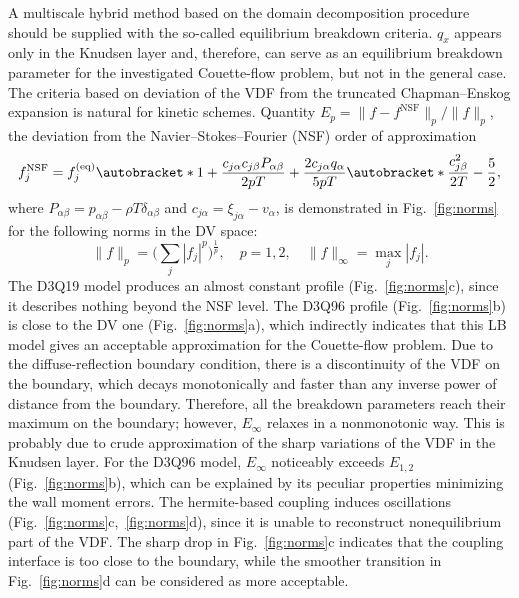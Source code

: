\documentclass{aip-cp}
\DeclarePairedDelimiter\autobracket()       %
\newcommand{\br}[1]{\autobracket*{#1}}
\newcommand{\xiai}{\xi_{j \alpha}}
\newcommand{\cai}{c_{j \alpha}}
\newcommand{\caj}{c_{j \beta}}
\newcommand{\equil}[1]{#1^\mathrm{(eq)}}
\begin{document}
A multiscale hybrid method based on the domain decomposition procedure should be supplied with the so-called equilibrium breakdown criteria.
\(q_x\) appears only in the Knudsen layer and, therefore, can serve as an equilibrium breakdown parameter
for the investigated Couette-flow problem, but not in the general case.
The criteria based on deviation of the VDF from the truncated Chapman--Enskog expansion is natural for kinetic schemes.
Quantity \(E_p=\|f-f^{\mathrm{NSF}}\|_p/\|f\|_p\), the deviation from the Navier--Stokes--Fourier (NSF) order of approximation~\cite{Zhang2014}
\begin{equation}\label{eq:NSF}
    f^{\mathrm{NSF}}_j = \equil{f}_j\br{
        1 + \frac{\cai\caj P_{\alpha\beta}}{2pT} + \frac{2\cai q_\alpha}{5pT}\br{\frac{\caj^2}{2T} - \frac52} },
\end{equation}
where \(P_{\alpha\beta} = p_{\alpha\beta} - \rho T\delta_{\alpha\beta}\) and \(\cai = \xiai - v_\alpha\),
is demonstrated in Fig.~\ref{fig:norms} for the following norms in the DV space:
\begin{equation}\label{eq:norms}
    \|f\|_p = \bigg(\sum_j |f_j|^p \bigg)^\frac1p, \quad p=1,2, \quad \|f\|_\infty = \max_j |f_j|.
\end{equation}
The D3Q19 model produces an almost constant profile (Fig.~\ref{fig:norms}c),
since it describes nothing beyond the NSF level.
The D3Q96 profile (Fig.~\ref{fig:norms}b) is close to the DV one (Fig.~\ref{fig:norms}a),
which indirectly indicates that this LB model gives an acceptable approximation for the Couette-flow problem.
Due to the diffuse-reflection boundary condition, there is a discontinuity of the VDF on the boundary,
which decays monotonically and faster than any inverse power of distance from the boundary.
Therefore, all the breakdown parameters reach their maximum on the boundary;
however, \(E_\infty\) relaxes in a nonmonotonic way.
This is probably due to crude approximation of the sharp variations of the VDF in the Knudsen layer.
For the D3Q96 model, \(E_\infty\) noticeably exceeds \(E_{1,2}\) (Fig.~\ref{fig:norms}b),
which can be explained by its peculiar properties minimizing the wall moment errors.
The hermite-based coupling induces oscillations (Fig.~\ref{fig:norms}c,~\ref{fig:norms}d),
since it is unable to reconstruct nonequilibrium part of the VDF.
The sharp drop in Fig.~\ref{fig:norms}c indicates that the coupling interface is too close to the boundary,
while the smoother transition in Fig.~\ref{fig:norms}d can be considered as more acceptable.
\end{document}
